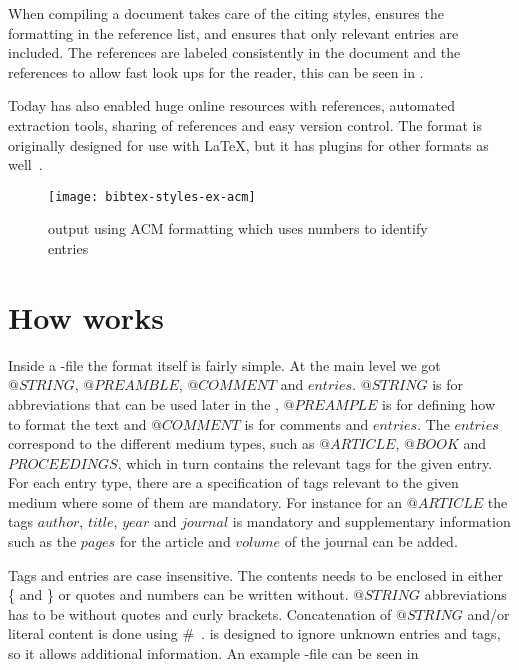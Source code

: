 When compiling a document {\bibtex} takes care of the citing styles,
ensures the formatting in the reference list, and ensures that only
relevant entries are included.  The references are labeled
consistently in the document and the references to allow fast look ups
for the reader, this can be seen in
.

Today {\bibtex} has also enabled huge online resources with
references, automated extraction tools, sharing of references and easy
version control.  The {\bibtex} format is originally designed for use
with {\LaTeX}, but it has plugins for other formats as
well~\cite{bibtex_resource}.

\begin{figure}[ht]
  \centering
  \texttt{[image: bibtex-styles-ex-acm]}
  \caption{{\bibtex} output using ACM formatting which uses numbers to
    identify entries}
\label{fig:bibtex_example_acm}
\end{figure}

\section{How {\bibtex} works}
\label{sec:practice_of_bibtex}

Inside a {\bibtex}-file the format itself is fairly simple. At the
main level we got $@STRING$, $@PREAMBLE$, $@COMMENT$ and $entries$.
$@STRING$ is for abbreviations that can be used later in the
{\bibtex}, $@PREAMPLE$ is for defining how to format the text and
$@COMMENT$ is for comments and $entries$.  The $entries$ correspond to
the different medium types, such as $@ARTICLE$, $@BOOK$ and
$PROCEEDINGS$, which in turn contains the relevant tags for the given
entry.  For each entry type, there are a specification of tags
relevant to the given medium where some of them are mandatory. For
instance for an $@ARTICLE$ the tags $author$, $title$, $year$ and
$journal$ is mandatory and supplementary information such as the
$pages$ for the article and $volume$ of the journal can be added.

Tags and entries are case insensitive. The contents needs to be
enclosed in either \{ and \} or quotes and numbers can be written
without. $@STRING$ abbreviations has to be without quotes and curly
brackets.  Concatenation of $@STRING$ and/or literal content is done
using \#~\cite{bibtex_resource}.  {\bibtex} is designed to ignore
unknown entries and tags, so it allows additional information.  An
example {\bibtex}-file can be seen in 

